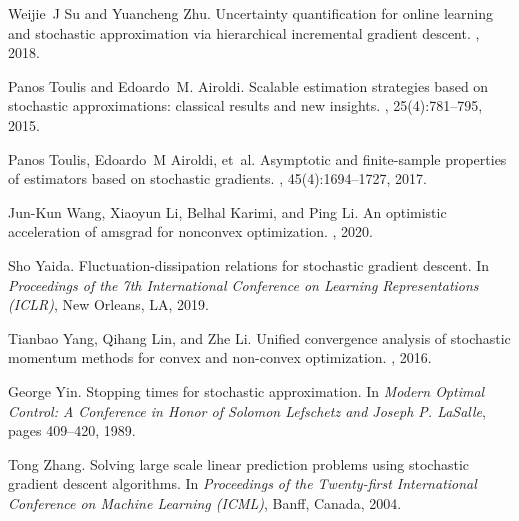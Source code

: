 \documentclass[conference]{IEEEtran}
\begin{document}
\begin{thebibliography}{10}
Weijie~J Su and Yuancheng Zhu.
\newblock Uncertainty quantification for online learning and stochastic
  approximation via hierarchical incremental gradient descent.
, 2018.

Panos Toulis and Edoardo~M. Airoldi.
\newblock Scalable estimation strategies based on stochastic approximations:
  classical results and new insights.
, 25(4):781--795, 2015.

Panos Toulis, Edoardo~M Airoldi, et~al.
\newblock Asymptotic and finite-sample properties of estimators based on
  stochastic gradients.
, 45(4):1694--1727, 2017.

Jun-Kun Wang, Xiaoyun Li, Belhal Karimi, and Ping Li.
\newblock An optimistic acceleration of amsgrad for nonconvex optimization.
, 2020.

Sho Yaida.
\newblock Fluctuation-dissipation relations for stochastic gradient descent.
\newblock In {\em Proceedings of the 7th International Conference on Learning
  Representations (ICLR)}, New Orleans, LA, 2019.

Tianbao Yang, Qihang Lin, and Zhe Li.
\newblock Unified convergence analysis of stochastic momentum methods for
  convex and non-convex optimization.
, 2016.

George Yin.
\newblock Stopping times for stochastic approximation.
\newblock In {\em Modern Optimal Control: A Conference in Honor of Solomon
  Lefschetz and Joseph P. LaSalle}, pages 409--420, 1989.

Tong Zhang.
\newblock Solving large scale linear prediction problems using stochastic
  gradient descent algorithms.
\newblock In {\em Proceedings of the Twenty-first International Conference on
  Machine Learning (ICML)}, Banff, Canada, 2004.

\end{thebibliography}
\end{document}
